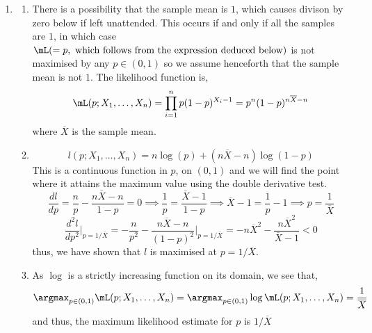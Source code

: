 \documentclass[12pt,a4paper]{article}\usepackage[]{graphicx}\usepackage[]{xcolor}
\makeatletter
\newcommand{\hlnum}[1]{\textcolor[rgb]{0.686,0.059,0.569}{#1}}%
\newcommand{\hlopt}[1]{\textcolor[rgb]{0,0,0}{#1}}%
\newcommand{\hldef}[1]{\textcolor[rgb]{0.345,0.345,0.345}{#1}}%
\newcommand{\hlkwb}[1]{\textcolor[rgb]{0.69,0.353,0.396}{#1}}%
\newcommand{\hlkwd}[1]{\textcolor[rgb]{0.737,0.353,0.396}{\textbf{#1}}}%
\newenvironment{kframe}{%
 \def\at@end@of@kframe{}%
 \ifinner\ifhmode%
  \def\at@end@of@kframe{\end{minipage}}%
  \begin{minipage}{\columnwidth}%
 \fi\fi%
 \def\FrameCommand##1{\hskip\@totalleftmargin \hskip-\fboxsep
 \colorbox{shadecolor}{##1}\hskip-\fboxsep
     \hskip-\linewidth \hskip-\@totalleftmargin \hskip\columnwidth}%
 \MakeFramed {\advance\hsize-\width
   \@totalleftmargin\z@ \linewidth\hsize
   \@setminipage}}%
 {\par\unskip\endMakeFramed%
 \at@end@of@kframe}
\newenvironment{knitrout}{}{} %
\makeatother
\begin{document}
\begin{enumerate}[label=\arabic*.]
\begin{enumerate}[label=(\alph*)]
\begin{knitrout}
\begin{kframe}
\begin{verbatim}
## [1] -0.03
\end{verbatim}
\begin{alltt}
\hldef{n} \hlkwb{=} \hlnum{1000}\hldef{;}
\hldef{N} \hlkwb{=} \hlnum{10}\hldef{;}
\hldef{p} \hlkwb{=} \hlnum{0.9}\hldef{;}
\hldef{x} \hlkwb{=} \hlkwd{rbinom}\hldef{(n,N,p);}
\hldef{m1} \hlkwb{=} \hlkwd{mean}\hldef{(x);}
\hldef{m2} \hlkwb{=} \hlkwd{mean}\hldef{(x}\hlopt{^}\hlnum{2}\hldef{);}
\hldef{Nhat} \hlkwb{=} \hldef{m1}\hlopt{^}\hlnum{2} \hlopt{/} \hldef{(m1} \hlopt{-} \hldef{(m2} \hlopt{-} \hldef{m1}\hlopt{^}\hlnum{2}\hldef{));}
\hldef{phat} \hlkwb{=} \hldef{(m1} \hlopt{-} \hldef{(m2} \hlopt{-} \hldef{m1}\hlopt{^}\hlnum{2}\hldef{))} \hlopt{/} \hldef{m1;}
\hldef{Nhat} \hlopt{-} \hldef{N}
\end{alltt}
\begin{verbatim}
## [1] 0.006464389
\end{verbatim}
\begin{alltt}
\hldef{phat} \hlopt{-} \hldef{p}
\end{alltt}
\begin{verbatim}
## [1] 0.000717741
\end{verbatim}
\end{kframe}
\end{knitrout}
	\end{enumerate}
	\item
	\begin{enumerate}[label=(\alph*)]
	\item There is a possibility that the sample mean is $1$, which causes
		divison by zero below if left unattended. This occurs if and
		only if all the samples are $1$, in which case $\mL(=p,\text{
		which follows from the expression deduced below})$ is not
		maximised by any $p\in (0,1)$ so we assume henceforth that the
		sample mean is not $1$. The likelihood function is,
	$$\mL(p;X_1,\ldots,X_n)=\prod_{i=1}^np(1-p)^{X_i-1}=p^n(1-p)^{n\overline{X}-n}$$
	where $\overline{X}$ is the sample mean. 
	\item $$l(p;X_1,\ldots,X_n)=n\log(p)+(n\overline{X}-n)\log(1-p)$$
	This is a continuous function in $p$, on $(0,1)$ and we will find the
	point where it attains the maximum value using the double derivative
	test.
	$$\frac{d
	l}{dp}=\frac{n}{p}-\frac{n\overline{X}-n}{1-p}=0\implies\frac{1}{p}=\frac{\overline{X}-1}{1-p}\implies\overline{X}-1=\frac{1}{p}-1\implies
	p=\frac{1}{\overline{X}}$$
	$$\frac{d^2l}{dp^2}\bigg|_{p=1/\overline{X}}=-\frac{n}{p^2}-\frac{n\overline{X}-n}{(1-p)^2}\bigg|_{p=1/\overline{X}}=-n\overline{X}^2-\frac{n\overline{X}^2}{\overline{X}-1}<0$$thus, we have shown that $l$ is maximised at $p=1/\overline{X}$.
\item As $\log$ is a strictly increasing function on its domain, we see that,
	$$\argmax_{p\in(0,1)}\mL(p;X_1,\ldots,X_n)=\argmax_{p\in(0,1)}\log\mL(p;X_1,\ldots,X_n)=\frac{1}{\overline{X}}$$
	and thus, the maximum likelihood estimate for $p$ is $1/\overline{X}$
	
	\end{enumerate}
\end{enumerate}
\end{document}
